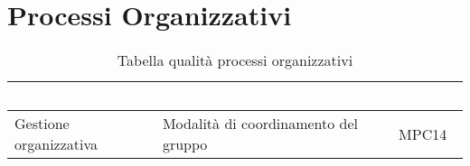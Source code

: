 \section{Processi Organizzativi}
\begin{table}[H]
  \renewcommand{\arraystretch}{1.25}
  \begin{tabular}{|p{2.5cm}|p{8cm}|p{1.7cm}|} \hline
    \rowcolor[HTML]{036400}
    \textcolor{white}{\textbf{Obiettivo}} & \textcolor{white}{\textbf{Descrizione}} & \textcolor{white}{\textbf{Metrica}}  \\ \hline
    \rowcolor[HTML]{EFEFEF}
    Gestione organizzativa & Modalità di coordinamento del gruppo & MPC14 \\ \hline
  \end{tabular}
  \caption{Tabella qualità processi organizzativi}
\end{table}

